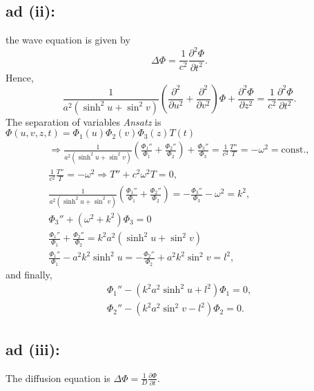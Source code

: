 {\subsection*{ad (ii):}
the wave equation is given by
$$
  \Delta\Phi=\frac{1}{c^2}\frac{\partial^2 \Phi}{\partial t^2}.
$$
Hence,
$$
  \frac{1}{a^2(\sinh^2u+\sin^2v)}
  \left(
    \frac{\partial^2}{\partial u^2}+\frac{\partial^2}{\partial v^2}
  \right)\Phi+
  \frac{\partial^2 \Phi}{\partial z^2}=
  \frac{1}{c^2}\frac{\partial^2 \Phi}{\partial t^2}.
$$
The separation of variables {\it Ansatz} is  $\Phi (u,v,z,t)=\Phi_1(u)\Phi_2(v)\Phi_3(z)T(t)$
\begin{equation}
\begin{split}
  \Longrightarrow
  \frac{1}{a^2(\sinh^2u+\sin^2v)}
  \left(
    \frac{\Phi_1''}{\Phi_1}+
    \frac{\Phi_2''}{\Phi_2}
  \right)+
  \frac{\Phi_3''}{\Phi_3}=\frac{1}{c^2}\frac{T''}{T}=-\omega^2=\mbox{const.},
\\
  \frac{1}{c^2}\frac{T''}{T}=-\omega^2 \Longrightarrow T''+c^2\omega^2T=0,
\\
  \frac{1}{a^2(\sinh^2u+\sin^2v)}
  \left(
    \frac{\Phi_1''}{\Phi_1}+
    \frac{\Phi_2''}{\Phi_2}
  \right)=
  -\frac{\Phi_3''}{\Phi_3}-\omega^2=k^2,
\\
  \Phi_3''+(\omega^2+k^2)\Phi_3=0
\\
  \frac{\Phi_1''}{\Phi_1}+
  \frac{\Phi_2''}{\Phi_2}=k^2a^2(\sinh^2u+\sin^2v)
\\
  \frac{\Phi_1''}{\Phi_1}-a^2k^2\sinh^2u=
  -\frac{\Phi_2''}{\Phi_2}+a^2k^2\sin^2v=l^2,
\end{split}
\end{equation}
and finally,
\begin{equation}
  \begin{split}
    \Phi_1''   -   (k^2a^2\sinh^2u+l^2)\Phi_1   =   0, \\
    \Phi_2''   -   (k^2a^2\sin^2v-l^2)\Phi_2   =   0.
  \end{split}
\end{equation}


\subsection*{ad (iii):}
The diffusion equation is
$\Delta\Phi=\frac{1}{D}\frac{\partial \Phi}{\partial t}$.

}
